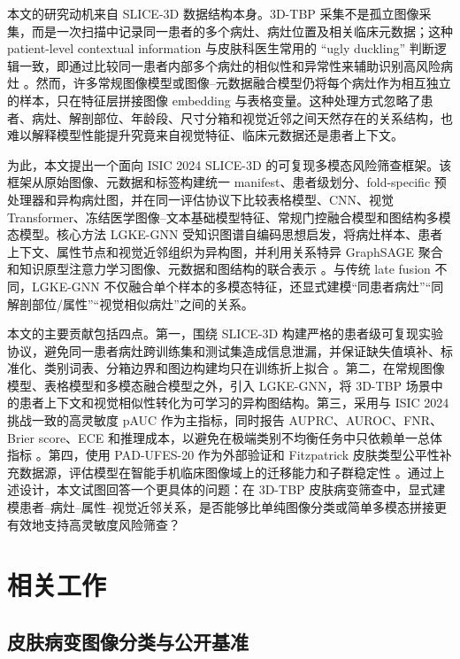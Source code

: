 \documentclass[UTF8,a4paper,10pt,twocolumn,fontset=fandol]{ctexart}
\begin{document}
本文的研究动机来自 SLICE-3D 数据结构本身。3D-TBP 采集不是孤立图像采集，而是一次扫描中记录同一患者的多个病灶、病灶位置及相关临床元数据；这种 patient-level contextual information 与皮肤科医生常用的 ``ugly duckling'' 判断逻辑一致，即通过比较同一患者内部多个病灶的相似性和异常性来辅助识别高风险病灶 \cite{rotemberg2021patient,kurtansky2024slice3d}。然而，许多常规图像模型或图像--元数据融合模型仍将每个病灶作为相互独立的样本，只在特征层拼接图像 embedding 与表格变量。这种处理方式忽略了患者、病灶、解剖部位、年龄段、尺寸分箱和视觉近邻之间天然存在的关系结构，也难以解释模型性能提升究竟来自视觉特征、临床元数据还是患者上下文。

为此，本文提出一个面向 ISIC 2024 SLICE-3D 的可复现多模态风险筛查框架。该框架从原始图像、元数据和标签构建统一 manifest、患者级划分、fold-specific 预处理器和异构病灶图，并在同一评估协议下比较表格模型、CNN、视觉 Transformer、冻结医学图像--文本基础模型特征、常规门控融合模型和图结构多模态模型。核心方法 LGKE-GNN 受知识图谱自编码思想启发，将病灶样本、患者上下文、属性节点和视觉近邻组织为异构图，并利用关系特异 GraphSAGE 聚合和知识原型注意力学习图像、元数据和图结构的联合表示 \cite{hamilton2017graphsage,liu2021kgae}。与传统 late fusion 不同，LGKE-GNN 不仅融合单个样本的多模态特征，还显式建模“同患者病灶”“同解剖部位/属性”“视觉相似病灶”之间的关系。

本文的主要贡献包括四点。第一，围绕 SLICE-3D 构建严格的患者级可复现实验协议，避免同一患者病灶跨训练集和测试集造成信息泄漏，并保证缺失值填补、标准化、类别词表、分箱边界和图边构建均只在训练折上拟合 \cite{cassidy2022isic,rotemberg2021patient}。第二，在常规图像模型、表格模型和多模态融合模型之外，引入 LGKE-GNN，将 3D-TBP 场景中的患者上下文和视觉相似性转化为可学习的异构图结构。第三，采用与 ISIC 2024 挑战一致的高灵敏度 pAUC 作为主指标，同时报告 AUPRC、AUROC、FNR、Brier score、ECE 和推理成本，以避免在极端类别不均衡任务中只依赖单一总体指标 \cite{isic2024challenge}。第四，使用 PAD-UFES-20 作为外部验证和 Fitzpatrick 皮肤类型公平性补充数据源，评估模型在智能手机临床图像域上的迁移能力和子群稳定性 \cite{pacheco2020padufes,daneshjou2022disparities,groh2021fitzpatrick17k}。通过上述设计，本文试图回答一个更具体的问题：在 3D-TBP 皮肤病变筛查中，显式建模患者--病灶--属性--视觉近邻关系，是否能够比单纯图像分类或简单多模态拼接更有效地支持高灵敏度风险筛查？

\section{相关工作}

\subsection{皮肤病变图像分类与公开基准}
\end{document}

